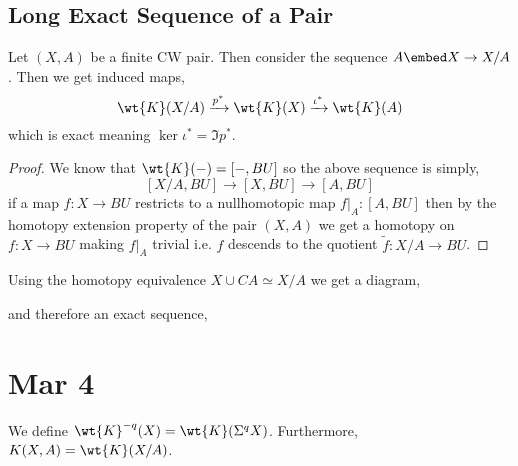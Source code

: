 \documentclass[12pt]{extarticle}
\begin{document}
\subsection{Long Exact Sequence of a Pair}

\begin{lemma}
Let $(X, A)$ be a finite CW pair. Then consider the sequence $A \embed X \to X / A$. Then we get induced maps,
\[ \wt{K}(X/A) \xrightarrow{p^*} \wt{K}(X) \xrightarrow{\iota^*} \wt{K}(A) \]
which is exact meaning $\ker{\iota^*} = \Im{p^*}$.
\end{lemma}

\begin{proof}
We know that $\wt{K}(-) = [-, BU]$ so the above sequence is simply,
\[ [X/A, BU] \to [X, BU] \to [A, BU]  \]
if a map $f : X \to BU$ restricts to a nullhomotopic map $f|_A : [A, BU]$ then by the homotopy extension property of the pair $(X, A)$ we get a homotopy on $f : X \to BU$ making $f |_A$ trivial i.e. $f$ descends to the quotient $\tilde{f} : X / A \to BU$.  
\end{proof}

\begin{rmk}
Using the homotopy equivalence $X \cup CA \simeq X/A$ we get a diagram,
\begin{center}
\end{center}
and therefore an exact sequence,
\begin{center}
\end{center}
\end{rmk}

\section{Mar 4}

\begin{defn}
We define $\wt{K}^{-q}(X) = \wt{K}(\Sigma^q X)$. Furthermore, $K(X, A) = \wt{K}(X/A)$.
\end{defn}
\end{document}
